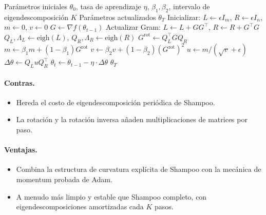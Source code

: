 \begin{algorithm}[H]
\caption{SOAP (Shampoo with Adam in Eigenbasis)}
\label{alg:soap}
\begin{algorithmic}[1]
\Require Parámetros iniciales $\theta_0$, tasa de aprendizaje $\eta$, $\beta_1, \beta_2$, intervalo de eigendescomposición $K$
\Ensure Parámetros actualizados $\theta_T$
\State Inicializar: $L \gets \epsilon I_m$, $R \gets \epsilon I_n$, $m \gets 0$, $v \gets 0$
    \State $G \gets \nabla f(\theta_{t-1})$ 
    \State Actualizar Gram: $L \gets L + G G^\top$, $R \gets R + G^\top G$
        \State $Q_L, \Lambda_L \gets \text{eigh}(L)$, $Q_R, \Lambda_R \gets \text{eigh}(R)$
    \EndIf
    \State $G^{\text{rot}} \gets Q_L^\top G Q_R$ 
    \State $m \gets \beta_1 m + (1-\beta_1) G^{\text{rot}}$ 
    \State $v \gets \beta_2 v + (1-\beta_2) (G^{\text{rot}})^2$ 
    \State $u \gets m / (\sqrt{v} + \epsilon)$ 
    \State $\Delta \theta \gets Q_L u Q_R^\top$ 
    \State $\theta_t \gets \theta_{t-1} - \eta \cdot \Delta \theta$
\EndFor
\Return $\theta_T$
\end{algorithmic}
\end{algorithm}

\paragraph{Contras.}
\begin{itemize}[leftmargin=*]
\item Hereda el costo de eigendescomposición periódica de Shampoo.
\item La rotación y la rotación inversa añaden multiplicaciones de matrices por paso.
\end{itemize}

\paragraph{Ventajas.}
\begin{itemize}[leftmargin=*]
\item Combina la estructura de curvatura explícita de Shampoo con la mecánica de momentum probada de Adam.
\item A menudo más limpio y estable que Shampoo completo, con eigendescomposiciones amortizadas cada $K$ pasos.
\end{itemize}

